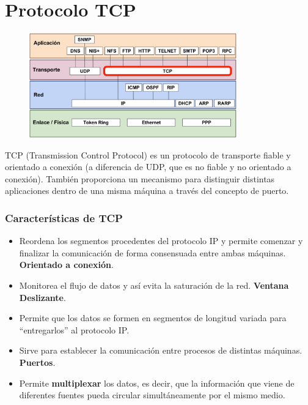\section{Protocolo TCP}
\begin{figure}[H]
    \centering
    \includegraphics[width=0.8\textwidth]{img/TCP.png}
\end{figure}
TCP (Transmission Control Protocol) es un protocolo de transporte fiable y orientado a conexión (a diferencia de UDP, que es no fiable y no orientado a conexión). También proporciona un mecanismo para distinguir distintas aplicaciones dentro de una misma máquina a través del concepto de puerto.

\subsubsection{Características de TCP}
\begin{itemize}
    \item Reordena los segmentos procedentes del protocolo IP y permite comenzar y finalizar la comunicación de forma consensuada entre ambas máquinas. \textbf{Orientado a conexión}.
    \item Monitorea el flujo de datos y así evita la saturación de la red. \textbf{Ventana Deslizante}.
    \item Permite que los datos se formen en segmentos de longitud variada para \enquote{entregarlos} al protocolo IP.
    \item Sirve para establecer la comunicación entre procesos de distintas máquinas. \textbf{Puertos}.
    \item Permite \textbf{multiplexar} los datos, es decir, que la información que viene de diferentes fuentes pueda circular simultáneamente por el mismo medio.
\end{itemize}
